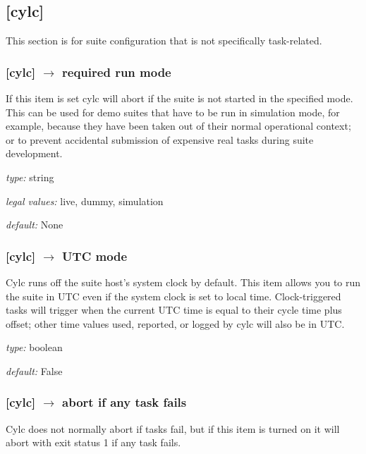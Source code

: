 \subsection{[cylc]}

This section is for suite configuration that is not specifically
task-related.

\subsubsection[required run mode]{ [cylc] $\rightarrow$ required run mode}

If this item is set cylc will abort if the suite is not started in the
specified mode. This can be used for demo suites that have to be
run in simulation mode, for example, because they have been taken out of
their normal operational context; or to prevent accidental submission of
expensive real tasks during suite development. 
\begin{myitemize}
    \item {\em type:} string
    \item {\em legal values:} live, dummy, simulation 
    \item {\em default:} None 
\end{myitemize}

\subsubsection[UTC mode]{ [cylc] $\rightarrow$ UTC mode}

Cylc runs off the suite host's system clock by default. This item allows
you to run the suite in UTC even if the system clock is set to local time.
Clock-triggered tasks will trigger when the current UTC time is equal to
their cycle time plus offset; other time values used, reported, or
logged by cylc will also be in UTC. 

\begin{myitemize}
    \item {\em type:} boolean
    \item {\em default:} False 
\end{myitemize}


\subsubsection[abort if any task fails]{[cylc] $\rightarrow$ abort if any task fails}

Cylc does not normally abort if tasks fail, but if this item is turned
on it will abort with exit status 1 if any task fails.

